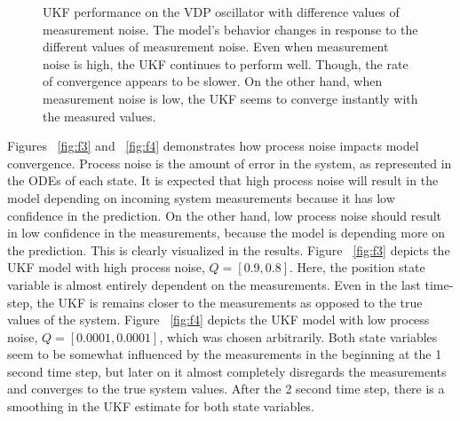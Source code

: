 \begin{figure}[ht]
  \centering
  \hfill
  \caption{UKF performance on the VDP oscillator with difference values of measurement noise.
  The model's behavior changes in response to the different values of measurement noise. Even when measurement noise is high, the UKF continues to perform well. Though, the rate of convergence appears to be slower.
On the other hand, when measurement noise is low, the UKF seems to converge instantly with the measured values.}
\end{figure}

\clearpage 
\noindent Figures ~\ref{fig:f3} and ~\ref{fig:f4} demonstrates how process noise impacts model convergence. Process noise is the amount of error in the system, as represented in the ODEs of each state. It is expected that high process noise will result in the model depending on incoming system measurements because it has low confidence in the prediction. On the other hand, low process noise should result in low confidence in the measurements, because the model is depending more on the prediction. This is clearly visualized in the results. Figure ~\ref{fig:f3} depicts the UKF model with high process noise, $Q=[0.9, 0.8]$. Here, the position state variable is almost entirely dependent on the measurements. Even in the last time-step, the UKF is remains closer to the measurements as opposed to the true values of the system. Figure ~\ref{fig:f4} depicts the UKF model with low process noise, $Q=[0.0001, 0.0001]$, which was chosen arbitrarily. Both state variables seem to be somewhat influenced by the measurements in the beginning at the 1 second time step, but later on it almost completely disregards the measurements and converges to the true system values. After the 2 second time step, there is a smoothing in the UKF estimate for both state variables.



